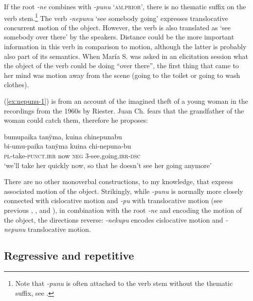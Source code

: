 If the root \textit{-ne} combines with \textit{-punu} ‘\textsc{am.prior}’, there is no thematic suffix on the verb stem.\footnote{Note that \textit{-punu} is often attached to the verb stem without the thematic suffix, see .} The verb \textit{-nepunu} ‘see somebody going’ expresses translocative concurrent motion of the object. However, the verb is also translated as ‘see somebody over there’ by the speakers. Distance could be the more important information in this verb in comparison to motion, although the latter is probably also part of its semantics. When María S. was asked in an elicitation session what the object of the verb could be doing “over there”, the first thing that came to her mind was motion away from the scene (going to the toilet or going to wash clothes). 

(\ref{ex:nepunu-1}) is from an account of the imagined theft of a young woman in the recordings from the 1960s by Riester. Juan Ch. fears that the grandfather of the woman could catch them, therefore he proposes:

\ea\label{ex:nepunu-1}
\begingl 
\glpreamble bumupaika tanÿma, kuina chinepunabu\\
\gla bi-umu-paika tanÿma kuina chi-nepuna-bu\\ 
\textsc{pl}-take-\textsc{punct.irr} now \textsc{neg} 3-see.going.\textsc{irr}-\textsc{dsc}\\ 
\glft ‘we’ll take her quickly now, so that he doesn’t see her going anymore’\\ 
\endgl
\trailingcitation{[nxx-a630101g-3.066]}
\xe

There are no other monoverbal constructions, to my knowledge, that express associated motion of the object. Strikingly, while \textit{-punu} is normally more closely connected with cislocative motion and \textit{-pu} with translocative motion (see previous , , and ), in combination with the root \textit{-ne} and encoding the motion of the object, the directions reverse: \textit{-nekupu} encodes cislocative motion and \textit{-nepunu} translocative motion.

\subsection{Regressive and repetitive}\label{sec:Repetition}

